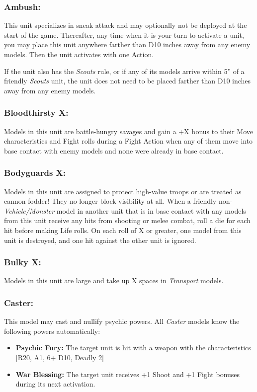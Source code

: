 \begin{multicols}{2}
\subsubsection*{Ambush:} This unit specializes in sneak attack and may optionally not be deployed at the start of the game. Thereafter, any time when it is your turn to activate a unit, you may place this unit anywhere farther than D10 inches away from any enemy models. Then the unit activates with one Action.

If the unit also has the \textit{Scouts} rule, or if any of its models arrive within 5'' of a friendly \textit{Scouts} unit, the unit does not need to be placed farther than D10 inches away from any enemy models.

\subsubsection*{Bloodthirsty X:} Models in this unit are battle-hungry savages and gain a +X bonus to their Move characteristics and Fight rolls during a Fight Action when any of them move into base contact with enemy models and none were already in base contact.

\subsubsection*{Bodyguards X:} Models in this unit are assigned to protect high-value troops or are treated as cannon fodder! They no longer block visibility at all. When a friendly non-\textit{Vehicle/Monster} model in another unit that is in base contact with any models from this unit receive any hits from shooting or melee combat, roll a die for each hit before making Life rolls. On each roll of X or greater, one model from this unit is destroyed, and one hit against the other unit is ignored.

\subsubsection*{Bulky X:} Models in this unit are large and take up X spaces in \textit{Transport} models.

\subsubsection*{Caster:} This model may cast and nullify psychic powers. All \textit{Caster} models know the following powers automatically:

\begin{itemize}
    \item \textbf{Psychic Fury:} The target unit is hit with a weapon with the characteristics [R20, A1, 6+ D10, Deadly 2]
    \item \textbf{War Blessing:} The target unit receives +1 Shoot and +1 Fight bonuses during its next activation.
\end{itemize}


\end{multicols}
